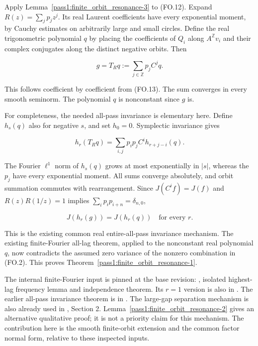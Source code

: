 Apply Lemma~\ref{pass1:finite_orbit_resonance-3} to (FO.12). Expand \(R(z)=\sum_j p_jz^j\). Its real Laurent coefficients have every exponential moment, by Cauchy estimates on arbitrarily large and small circles. Define the real trigonometric polynomial \(q\) by placing the coefficients of \(Q_i\) along \(A^{\mathbb Z}v_i\) and their complex conjugates along the distinct negative orbits. Then

\[
 g=T_Rq:=\sum_{j\in\mathbb Z}p_j C^j q.
\tag{FO.15}
\]

This follows coefficient by coefficient from (FO.13). The sum converges in every smooth seminorm. The polynomial \(q\) is nonconstant since \(g\) is.

For completeness, the needed all-pass invariance is elementary here. Define \(h_s(q)\) also for negative \(s\), and set \(h_0=0\). Symplectic invariance gives

\[
 h_r(T_Rq)=\sum_{i,j}p_i p_j C^i h_{r+j-i}(q).
\]

The Fourier \(\ell^1\) norm of \(h_s(q)\) grows at most exponentially in \(|s|\), whereas the \(p_j\) have every exponential moment. All sums converge absolutely, and orbit summation commutes with rearrangement. Since \(J(C^if)=J(f)\) and \(R(z)R(1/z)=1\) implies \(\sum_i p_ip_{i+n}=\delta_{n,0}\),

\[
 \boxed{J(h_r(g))=J(h_r(q))\quad\text{for every }r.}
\tag{FO.16}
\]

This is the existing common real entire-all-pass invariance mechanism. The existing finite-Fourier all-lag theorem, applied to the nonconstant real polynomial \(q\), now contradicts the assumed zero variance of the nonzero combination in (FO.2). This proves Theorem~\ref{pass1:finite_orbit_resonance-1}.

The internal finite-Fourier input is pinned at the base revision: , isolated highest-lag frequency lemma and independence theorem. Its \(r=1\) version is also in . The earlier all-pass invariance theorem is in . The large-gap separation mechanism is also already used in , Section 2. Lemma~\ref{pass1:finite_orbit_resonance-2} gives an alternative qualitative proof; it is not a priority claim for this mechanism. The contribution here is the smooth finite-orbit extension and the common factor normal form, relative to these inspected inputs.

